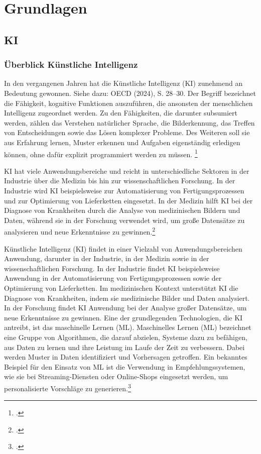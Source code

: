 \chapter{Grundlagen}

\section{KI}

\subsection{Überblick Künstliche Intelligenz}

In den vergangenen Jahren hat die Künstliche Intelligenz (KI) zunehmend an Bedeutung gewonnen. Siehe dazu: OECD (2024), S. 28–30. Der Begriff bezeichnet die Fähigkeit, kognitive Funktionen auszuführen, die ansonsten der menschlichen Intelligenz zugeordnet werden. Zu den Fähigkeiten, die darunter subsumiert werden, zählen das Verstehen natürlicher Sprache, die Bilderkennung, das Treffen von Entscheidungen sowie das Lösen komplexer Probleme. Des Weiteren soll sie aus Erfahrung lernen, Muster erkennen und Aufgaben eigenständig erledigen können, ohne dafür explizit programmiert werden zu müssen. \footcite[9]{gethmann_kunstliche_2022}

\ac{KI} hat viele Anwendungsbereiche und reicht in unterschiedliche Sektoren in der Industrie über die Medizin bis hin zur wissenschaftlichen Forschung. In der Industrie wird KI beispielsweise zur Automatisierung von Fertigungsprozessen und zur Optimierung von Lieferketten eingesetzt. In der Medizin hilft KI bei der Diagnose von Krankheiten durch die Analyse von medizinischen Bildern und Daten, während sie in der Forschung verwendet wird, um große Datensätze zu analysieren und neue Erkenntnisse zu gewinnen.\footcite[9]{gethmann_kunstliche_2022}

Künstliche Intelligenz (KI) findet in einer Vielzahl von Anwendungsbereichen Anwendung, darunter in der Industrie, in der Medizin sowie in der wissenschaftlichen Forschung. In der Industrie findet KI beispielsweise Anwendung in der Automatisierung von Fertigungsprozessen sowie der Optimierung von Lieferketten. Im medizinischen Kontext unterstützt KI die Diagnose von Krankheiten, indem sie medizinische Bilder und Daten analysiert. In der Forschung findet KI Anwendung bei der Analyse großer Datensätze, um neue Erkenntnisse zu gewinnen. Eine der grundlegenden Technologien, die KI antreibt, ist das maschinelle Lernen (ML). Maschinelles Lernen (ML) bezeichnet eine Gruppe von Algorithmen, die darauf abzielen, Systeme dazu zu befähigen, aus Daten zu lernen und ihre Leistung im Laufe der Zeit zu verbessern. Dabei werden Muster in Daten identifiziert und Vorhersagen getroffen. Ein bekanntes Beispiel für den Einsatz von ML ist die Verwendung in Empfehlungssystemen, wie sie bei Streaming-Diensten oder Online-Shops eingesetzt werden, um personalisierte Vorschläge zu generieren.\footcite[15]{oecd_oecd-bericht_2024}

